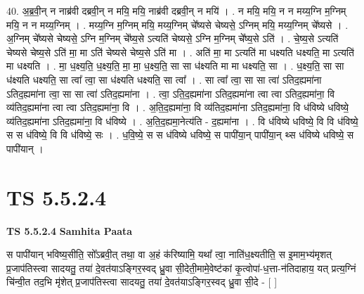 \documentclass[17pt]{extarticle}
\begin{document}
40. अ॒ब्र॒वी॒न् न नाब्र॑वी दब्रवी॒न् न मयि॒ मयि॒ नाब्र॑वी दब्रवी॒न् न मयि॑ । . न मयि॒ मयि॒ न न मय्य॒ग्नि म॒ग्निम् मयि॒ न न मय्य॒ग्निम् । . मय्य॒ग्नि म॒ग्निम् मयि॒ मय्य॒ग्निम् चे᳚ष्यसे चेष्यसे॒ ऽग्निम् मयि॒ मय्य॒ग्निम् चे᳚ष्यसे । . अ॒ग्निम् चे᳚ष्यसे चेष्यसे॒ ऽग्नि म॒ग्निम् चे᳚ष्य॒से ऽत्यति॑ चेष्यसे॒ ऽग्नि म॒ग्निम् चे᳚ष्य॒से ऽति॑ । . चे॒ष्य॒से ऽत्यति॑ चेष्यसे चेष्य॒से ऽति॑ मा॒ मा ऽति॑ चेष्यसे चेष्य॒से ऽति॑ मा । . अति॑ मा॒ मा ऽत्यति॑ मा धक्ष्यति धक्ष्यति॒ मा ऽत्यति॑ मा धक्ष्यति । . मा॒ ध॒क्ष्य॒ति॒ ध॒क्ष्य॒ति॒ मा॒ मा॒ ध॒क्ष्य॒ति॒ सा सा ध॑क्ष्यति मा मा धक्ष्यति॒ सा । . ध॒क्ष्य॒ति॒ सा सा ध॑क्ष्यति धक्ष्यति॒ सा त्वा᳚ त्वा॒ सा ध॑क्ष्यति धक्ष्यति॒ सा त्वा᳚ । . सा त्वा᳚ त्वा॒ सा सा त्वा॑ ऽतिद॒ह्यमा॑ना ऽतिद॒ह्यमा॑ना त्वा॒ सा सा त्वा॑ ऽतिद॒ह्यमा॑ना । . त्वा॒ ऽति॒द॒ह्यमा॑ना ऽतिद॒ह्यमा॑ना त्वा त्वा ऽतिद॒ह्यमा॑ना॒ वि व्य॑तिद॒ह्यमा॑ना त्वा त्वा ऽतिद॒ह्यमा॑ना॒ वि । . अ॒ति॒द॒ह्यमा॑ना॒ वि व्य॑तिद॒ह्यमा॑ना ऽतिद॒ह्यमा॑ना॒ वि ध॑विष्ये धविष्ये॒ व्य॑तिद॒ह्यमा॑ना ऽतिद॒ह्यमा॑ना॒ वि ध॑विष्ये । . अ॒ति॒द॒ह्यमा॒नेत्य॑ति - द॒ह्यमा॑ना । . वि ध॑विष्ये धविष्ये॒ वि वि ध॑विष्ये॒ स स ध॑विष्ये॒ वि वि ध॑विष्ये॒ सः । . ध॒वि॒ष्ये॒ स स ध॑विष्ये धविष्ये॒ स पापी॑या॒न् पापी॑या॒न् थ्स ध॑विष्ये धविष्ये॒ स पापी॑यान् । \newline
\pagebreak
{}

\section{ TS 5.5.2.4 }

\textbf{TS 5.5.2.4 } \newline
\textbf{Samhita Paata} \newline

स पापी॑यान् भविष्य॒सीति॒ सो᳚ऽब्रवी॒त् तथा॒ वा अ॒हं क॑रिष्यामि॒ यथा᳚ त्वा॒ नाति॑ध॒क्ष्यतीति॒ स इ॒माम॒भ्य॑मृशत् प्र॒जाप॑तिस्त्वा सादयतु॒ तया॑ दे॒वत॑याऽङ्गिर॒स्वद् ध्रु॒वा सी॒देती॒मामे॒वेष्ट॑कां कृ॒त्वोपा॑-ध॒त्ता-न॑तिदाहाय॒ यत् प्रत्य॒ग्निं चि॑न्वी॒त तद॒भि मृ॑शेत् प्र॒जाप॑तिस्त्वा सादयतु॒ तया॑ दे॒वत॑याऽङ्गिर॒स्वद् ध्रु॒वा सी॒दे - [  ] \newline
\end{document}
